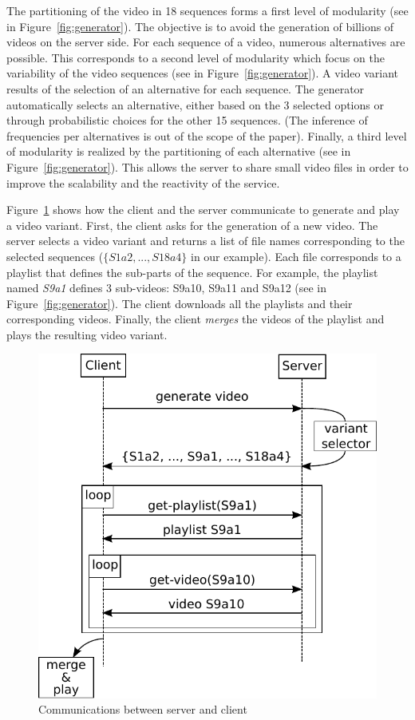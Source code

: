 The partitioning of the video in 18 sequences forms a first level of modularity (see  in Figure~\ref{fig:generator}). The objective is to avoid the generation of billions of videos on the server side.
For each sequence of a video, numerous alternatives are possible. This corresponds to a second level of modularity which focus on the variability of the video sequences (see  in Figure~\ref{fig:generator}). A video variant results of the selection of an alternative for each sequence. The generator automatically selects an alternative, either based on the 3 selected options or through probabilistic choices for the other 15 sequences. (The inference of frequencies per alternatives is out of the scope of the paper).
Finally, a third level of modularity is realized by the partitioning of each alternative (see  in Figure~\ref{fig:generator}). This allows the server to share small video files in order to improve the scalability and the reactivity of the service.



Figure~\ref{fig:process} shows how the client and the server communicate to generate and play a video variant. First, the client asks for the generation of a new video. The server selects a video variant and returns a list of file names corresponding to the selected sequences ($\{S1a2, ..., S18a4\}$ in our example).  
Each file corresponds to a playlist that defines the sub-parts of the sequence. For example, the playlist named \textit{S9a1} defines 3 sub-videos: S9a10, S9a11 and S9a12 (see  in Figure~\ref{fig:generator}).
The client downloads all the playlists and their corresponding videos. Finally, the client \emph{merges} the videos of the playlist and plays the resulting video variant.


\begin{figure}
\centering
\includegraphics[width=0.9\linewidth]{figures/server-client.pdf}
\caption{\label{fig:process}Communications between server and client}
\end{figure}





